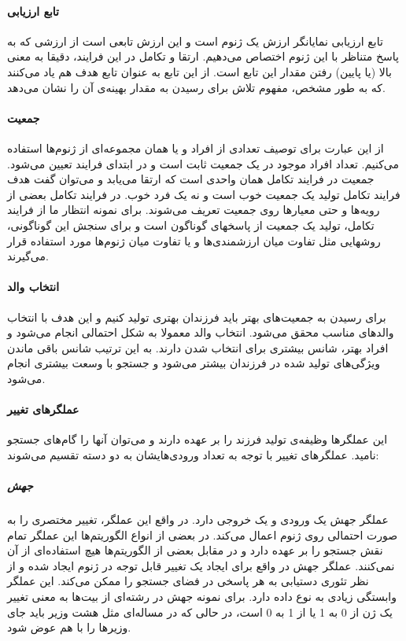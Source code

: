 \documentclass{report}
\begin{document}
\paragraph{تابع ارزیابی}
تابع ارزیابی نمایانگر ارزش یک ژنوم است و این ارزش تابعی است از ارزشی که به پاسخ متناظر با این ژنوم اختصاص می‌دهیم. ارتقا و تکامل در این فرایند، دقیقا به معنی بالا (یا پایین) رفتن مقدار این تابع است. از این تابع به عنوان تابع هدف هم یاد می‌کنند که به طور مشخص، مفهوم تلاش برای رسیدن به مقدار بهینه‌ی آن را نشان می‌دهد.

\paragraph{جمعیت}
از این عبارت برای توصیف تعدادی از افراد و یا همان مجموعه‌ای از ژنوم‌ها استفاده می‌کنیم. تعداد افراد موجود در یک جمعیت ثابت است و در ابتدای فرایند تعیین می‌شود. جمعیت در فرایند تکامل همان واحدی است که ارتقا می‌یابد و می‌توان گفت هدف فرایند تکامل تولید یک جمعیت خوب است و نه یک فرد خوب. در فرایند تکامل بعضی از رویه‌ها و حتی معیارها روی جمعیت تعریف می‌شوند. برای نمونه انتظار ما از فرایند تکامل، تولید یک جمعیت از پاسخهای گوناگون است و برای سنجش این گوناگونی، روشهایی مثل تفاوت میان ارزشمندی‌ها و یا تفاوت میان ژنوم‌ها مورد استفاده قرار می‌گیرند.

\paragraph{انتخاب والد}
برای رسیدن به جمعیت‌های بهتر باید فرزندان بهتری تولید کنیم و این هدف با انتخاب والدهای مناسب محقق می‌شود. انتخاب والد معمولا به شکل احتمالی انجام می‌شود و افراد بهتر، شانس بیشتری برای انتخاب شدن دارند. به این ترتیب شانس باقی ماندن ویژگی‌های تولید شده در فرزندان بیشتر می‌شود و جستجو با وسعت بیشتری انجام می‌شود.

\paragraph{عملگرهای تغییر}
این عملگرها وظیفه‌ی تولید فرزند را بر عهده دارند و می‌توان آنها را گام‌های جستجو نامید. عملگرهای تغییر با توجه به تعداد ورودی‌هایشان به دو دسته تقسیم می‌شوند:

\subparagraph{جهش}
عملگر جهش یک ورودی و یک خروجی دارد. در واقع این عملگر، تغییر مختصری را به صورت احتمالی روی ژنوم اعمال می‌کند. در بعضی از انواع الگوریتم‌ها این عملگر تمام نقش جستجو را بر عهده دارد و در مقابل بعضی از الگوریتم‌ها هیچ استفاده‌ای از آن نمی‌کنند. عملگر جهش در واقع برای ایجاد یک تغییر قابل توجه در ژنوم ایجاد شده و از نظر تئوری دستیابی به هر پاسخی در فضای جستجو را ممکن می‌کند. این عملگر وابستگی زیادی به نوع داده دارد. برای نمونه جهش در رشته‌ای از بیت‌ها به معنی تغییر یک ژن از 0 به 1 یا از 1 به 0 است، در حالی که در مساله‌ای مثل هشت وزیر باید جای وزیرها را با هم عوض شود.
\end{document}
